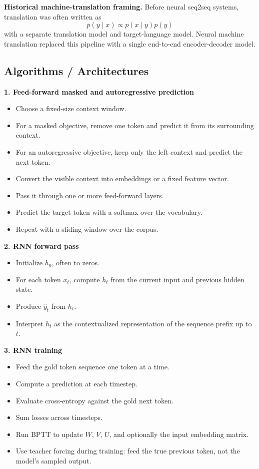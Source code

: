 \documentclass[11pt]{article}
\begin{document}
\textbf{Historical machine-translation framing.} Before neural seq2seq systems, translation was often written as
\[
p(y \mid x) \propto p(x \mid y)p(y)
\]
with a separate translation model and target-language model. Neural machine translation replaced this pipeline with a single end-to-end encoder-decoder model.

\subsection{Algorithms / Architectures}
\textbf{1. Feed-forward masked and autoregressive prediction}
\begin{itemize}
    \item Choose a fixed-size context window.
    \item For a masked objective, remove one token and predict it from its surrounding context.
    \item For an autoregressive objective, keep only the left context and predict the next token.
    \item Convert the visible context into embeddings or a fixed feature vector.
    \item Pass it through one or more feed-forward layers.
    \item Predict the target token with a softmax over the vocabulary.
    \item Repeat with a sliding window over the corpus.
\end{itemize}

\textbf{2. RNN forward pass}
\begin{itemize}
    \item Initialize \(h_0\), often to zeros.
    \item For each token \(x_t\), compute \(h_t\) from the current input and previous hidden state.
    \item Produce \(\hat{y}_t\) from \(h_t\).
    \item Interpret \(h_t\) as the contextualized representation of the sequence prefix up to \(t\).
\end{itemize}

\textbf{3. RNN training}
\begin{itemize}
    \item Feed the gold token sequence one token at a time.
    \item Compute a prediction at each timestep.
    \item Evaluate cross-entropy against the gold next token.
    \item Sum losses across timesteps.
    \item Run BPTT to update \(W\), \(V\), \(U\), and optionally the input embedding matrix.
    \item Use teacher forcing during training: feed the true previous token, not the model's sampled output.
\end{itemize}
\end{document}
